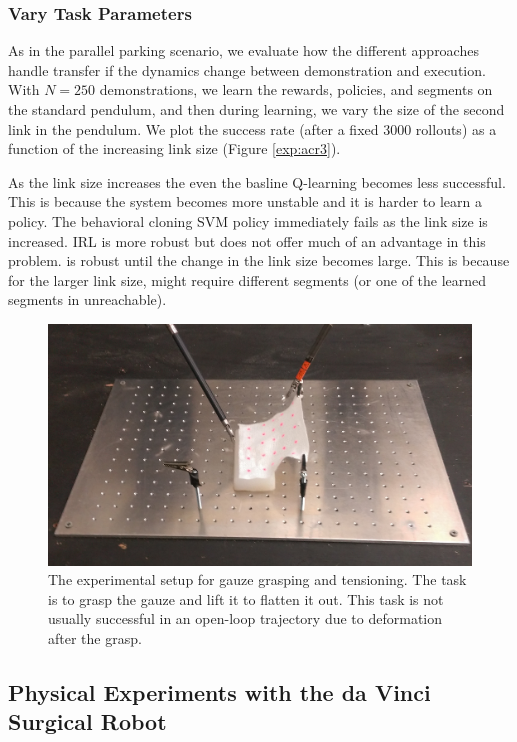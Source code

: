 \subsubsection{Vary Task Parameters}
As in the parallel parking scenario, we evaluate how the different approaches handle transfer if the dynamics change between demonstration and execution.
With $N=250$ demonstrations, we learn the rewards, policies, and segments on the standard pendulum, and then during learning, we vary the size of the second link in the pendulum.
We plot the success rate (after a fixed 3000 rollouts) as a function of the increasing link size (Figure \ref{exp:acr3}).

As the link size increases the even the basline Q-learning becomes less successful. This is because the system becomes more unstable and it is harder to learn a policy.
The behavioral cloning SVM policy immediately fails as the link size is increased.
IRL is more robust but does not offer much of an advantage in this problem.
\hirl is robust until the change in the link size becomes large.
This is because for the larger link size, \hirl might require different segments (or one of the learned segments in unreachable).



\begin{figure}[t]
\centering
    \includegraphics[width=0.8\columnwidth]{exp/IMAG0249.jpg}
    \caption{The experimental setup for gauze grasping and tensioning. The task is to grasp the gauze and lift it to flatten it out. This task is not usually successful in an open-loop trajectory due to deformation after the grasp.
    }
    \label{exp:dvrk2}
\end{figure}


\subsection{Physical Experiments with the da Vinci Surgical Robot}

